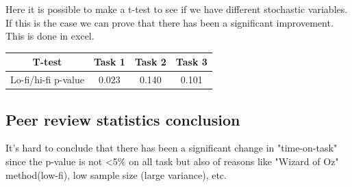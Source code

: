 Here it is possible to make a t-test to see if we have different stochastic variables. If this is the case we can prove that there has been a significant improvement. This is done in excel.
\begin{table}[H]
\centering
\begin{tabular}{|c|c|c|c|}
\hline
T-test & Task 1 & Task 2 & Task 3 \\  \hline
Lo-fi/hi-fi p-value & 0.023 & 0.140 & 0.101 \\ 
\hline 
\end{tabular} 
\end{table}
\subsection{Peer review statistics conclusion}
It's hard to conclude that there has been a significant change in "time-on-task" since the p-value is not <5\% on all task but also of reasons like "Wizard of Oz" method(low-fi), low sample size (large variance), etc.\\
